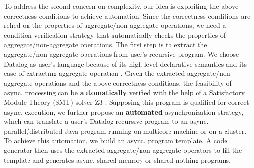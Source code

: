 To address the second concern on complexity, our idea is exploiting the above correctness conditions to achieve automation. Since the correctness conditions are relied on the properties of aggregate/non-aggregate operations, we need a condition verification strategy that automatically checks the properties of aggregate/non-aggregate operations. The first step is to extract the aggregate/non-aggregate operations from user's recursive program. We choose Datalog \cite{} as user's language because of its high level declarative semantics and its ease of extracting aggregate operation \cite{Shkapsky:2016:BDA:2882903.2915229}. Given the extracted aggregate/non-aggregate operations and the above correctness conditions, the feasibility of async. processing can be \textbf{automatically} verified with the help of a Satisfactory Module Theory (SMT) solver Z3 \cite{DeMoura:2008:ZES:1792734.1792766}. Supposing this program is qualified for correct async. execution, we further propose an \textbf{automated} asynchronization strategy, which can translate a user's Datalog recursive program to an async. parallel/distributed Java program running on multicore machine or on a cluster. To achieve this automation, we build an async. program template. A code generator then uses the extracted aggregate/non-aggregate operators to fill the template and generates async. shared-memory or shared-nothing programs.




